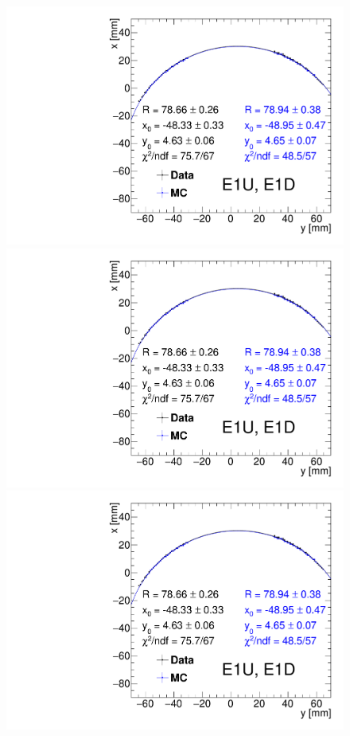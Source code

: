 \begin{figure}[hb]
{}~
\parbox{0.495\textwidth}{
  \centering
  \includegraphics[width=\linewidth,page=1]{graphics/rpSim/Apertures_swapedAxes_withFit.pdf}\\
  \includegraphics[width=\linewidth,page=2]{graphics/rpSim/Apertures_swapedAxes_withFit.pdf}\\
  \includegraphics[width=\linewidth,page=3]{graphics/rpSim/Apertures_swapedAxes_withFit.pdf}
}%
\end{figure}
